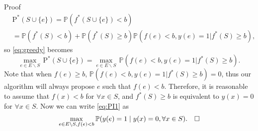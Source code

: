 \documentclass[opre,nonblindrev]{informs3} %
\newcommand{\PI}{\text{P}^*}
\begin{document}
\begin{APPENDIX}{Proof}
  \begin{equation*}
    \begin{split}
      &\PI(S \cup \{e\}) = \mathbb{P}(f^*(S\cup \{e\})<b)\\
      &= \mathbb{P}(f^*(S)<b) + \mathbb{P}(f^*(S)\geq b) \mathbb{P}(f(e)<b, y(e)=1|f^*(S)\geq b),
    \end{split}
  \end{equation*}
  so \eqref{eq:greedy} becomes
  \begin{equation} \label{eq:PI1} 
    \underset{e \in E \backslash S}{\max} \, \PI(S \cup \{e\}) = \underset{e \in E \backslash S}{\max} \, \mathbb{P}(f(e)<b, y(e)=1|f^*(S)\geq b).
  \end{equation}
  Note that when $f(e) \geq b$, $\mathbb{P}(f(e)<b, y(e)=1|f^*(S)\geq b)=0$, thus our algorithm will always propose $e$ such that $f(e)<b$. Therefore, it is reasonable to assume that $f(x)<b$ for $\forall x \in S$, and $f^*(S)\geq b$ is equivalent to $y(x)=0$ for $\forall x \in S$. Now we can write \eqref{eq:PI1} as 
  \begin{equation*}
    \underset{e \in E \backslash S, f(e) < b}{\max} \, \mathbb{P} (y(e) = 1 \mid y(x) = 0, \forall x \in S). \mbox{\quad$\square$}
  \end{equation*}
\endproof


\end{APPENDIX}
\end{document}
